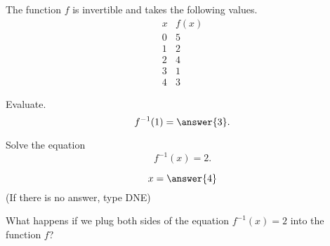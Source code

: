\documentclass{ximera}
\author{Bobby Ramsey}
\begin{document}
The function $f$ is invertible and takes the following values.
\[
\begin{array}{c|c}
  x & f(x)\\\hline
  0 & 5\\
  1 & 2\\
  2 & 4\\
  3 & 1\\
  4 & 3
\end{array}
\]

\begin{exercise}

	Evaluate.
	\[ f^{-1}(1) = \answer{3}.\]
\end{exercise}

\begin{exercise}

	Solve the equation \[ f^{-1}(x) = 2. \]	
	
	\[ x = \answer{4}\]
	(If there is no answer, type DNE)
	\begin{hint}
		What happens if we plug both sides of the equation $f^{-1}(x) = 2$ into the function $f$?
	\end{hint}

\end{exercise}
\end{document}
